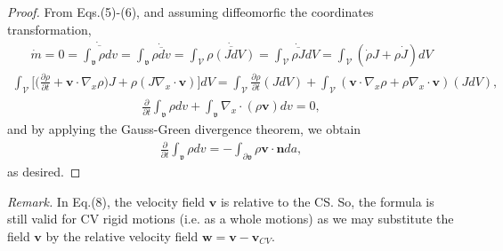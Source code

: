 \documentclass[12pt]{article}
\begin{document}
{\begin{proof}
From Eqs.(5)-(6), and assuming diffeomorfic the coordinates transformation,
\begin{align*}
\dot{m}=0=\dot{\overline{\int_{\mathfrak{v}}\rho{dv}}}=
\int_{\mathfrak{v}}\dot{\overline{\rho{dv}}}=
\int_{\mathscr{V}}\dot{\overline{\rho(JdV)}}=
\int_{\mathscr{V}}\dot{\overline{\rho J}}dV=
\int_{\mathscr{V}}(\dot{\rho}J+\rho\dot{J})dV 
\end{align*}
\begin{align*}
\int_{\mathscr{V}}\Big[\Big(\frac{\partial\rho}{\partial t}+
\mathbf{v}\!\cdot\!\nabla_{\!x}\rho\Big)J+
\rho(J\nabla_{\!x}\!\cdot\!\mathbf{v})\Big]dV=
\int_{\mathscr{V}}\frac{\partial\rho}{\partial t}(JdV)+
\int_{\mathscr{V}}(\mathbf{v}\!\cdot\!\nabla_{\!x}\rho+
\rho\nabla_{\!x}\!\cdot\!\mathbf{v})(JdV),
\end{align*}
\begin{align*}
\frac{\partial}{\partial t}\!\int_{\mathfrak{v}}\rho dv+
\int_{\mathfrak{v}}\nabla_{\!x}\!\cdot\!(\rho\mathbf{v})dv=0,
\end{align*}
and by applying the Gauss-Green divergence theorem, we obtain
\begin{align}
\frac{\partial}{\partial t}\!\int_{\mathfrak{v}}\rho dv=
-\int_{\partial\mathfrak{v}}\!\rho\mathbf{v}\!\cdot\!\mathbf{n}da,
\end{align}
as desired. 
\end{proof}
{\em Remark.} In Eq.(8), the velocity field $\mathbf{v}$ is relative to the CS. So, the formula is still valid for CV rigid motions (i.e. as a whole motions) as we may substitute the field $\mathbf{v}$ by the relative velocity field 
$\mathbf{w}=\mathbf{v}-\mathbf{v}_{CV}$.
}
\end{document}
